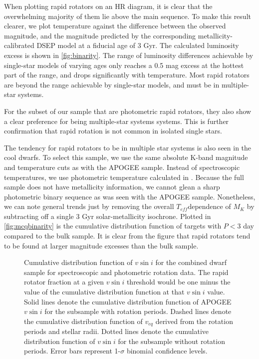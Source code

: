 \documentclass[manuscript]{aastex6}
\newcommand{\vsini}{\ensuremath{v \sin i}}
\newcommand{\Teff}{\ensuremath{T_{eff}}}
\begin{document}
When plotting rapid rotators on an HR diagram, it is clear that the
overwhelming majority of them lie above the main sequence. To make this
result clearer, we plot temperature against the difference between the
observed magnitude, and the magnitude predicted by the corresponding
metallicity-calibrated DSEP model at a fiducial age of 3 Gyr. The
calculated luminosity excess is shown in \cref{fig:binarity}. The range
of luminosity differences achievable by single-star models of varying
ages only reaches a 0.5 mag excess at the hottest part of the range, and
drops significantly with temperature. Most rapid rotators are beyond the
range achievable by single-star models, and must be in multiple-star
systems.

For the subset of our sample that are photometric rapid rotators, they
also show a clear preference for being multiple-star systems systems.
This is further confirmation that rapid rotation is not common in
isolated single stars.

The tendency for rapid rotators to be in multiple star systems is also
seen in the \citet{McQuillan14} cool dwarfs. To select this sample, we
use the same absolute K-band magnitude and temperature cuts as with the
APOGEE sample. Instead of spectroscopic temperatures, we use photometric 
temperature calculated in \citet{Mathur17}. Because the full \citet{McQuillan14} 
sample does not have metallicity information, we cannot glean a sharp
photometric binary sequence as was seen with the APOGEE sample. Nonetheless,
we can note general trends just by removing the overall \Teff dependence of
\(M_K\) by subtracting off  a single 3 Gyr solar-metallicity
isochrone. Plotted in \cref{fig:mcqbinarity} is the cumulative distribution
function of \citet{McQuillan14} targets with \(P < 3\) day compared to the bulk
sample. It is clear from the figure that rapid rotators tend to be found at
larger magnitude excesses than the bulk sample.

\begin{figure}[htb]
    \caption{Cumulative distribution function of \vsini{} for the combined
        dwarf sample for spectroscopic and photometric rotation data. The 
        rapid rotator fraction at a given \vsini{} threshold
    would be one minus the value of the cumulative distribution function
    at that \vsini{} value. Solid lines denote the cumulative
    distribution function of APOGEE \vsini{} for the subsample with rotation
    periods. Dashed lines denote  
    the cumulative distribution function of \(v_{eq}\) derived from the
    rotation periods and stellar radii. Dotted lines denote the
    cumulative distribution function of \vsini{} for the subsample without
    rotation periods. Error bars represent 
    1-\(\sigma\) binomial confidence levels.\label{fig:detection_fraction}}
\end{figure}
\end{document}
